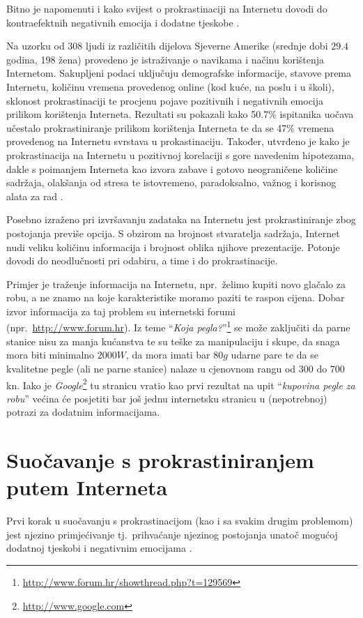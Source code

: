 \documentclass[11pt,english]{article}
\begin{document}
\begin{multicols}{2}
Bitno je napomenuti i kako svijest o prokrastinaciji na Internetu dovodi do
kontraefektnih negativnih emocija i dodatne tjeskobe \cite{Kraut98internet}.

Na uzorku od 308 ljudi iz različitih dijelova Sjeverne Amerike (srednje dobi
$29.4$ godina, 198 žena) provedeno je istraživanje o navikama i načinu korištenja
Internetom. Sakupljeni podaci uključuju demografske informacije, stavove prema
Internetu, količinu vremena provedenog online (kod kuće, na poslu i u školi),
sklonost prokrastinaciji te procjenu pojave pozitivnih i negativnih emocija
prilikom korištenja Interneta. Rezultati su pokazali kako 50.7\% ispitanika
uočava učestalo prokrastiniranje prilikom korištenja Interneta te da se 47\%
vremena provedenog na Internetu svrstava u prokastinaciju. Također, utvrđeno je
kako je prokrastinacija na Internetu u pozitivnoj korelaciji s gore navedenim
hipotezama, dakle s poimanjem Interneta kao izvora zabave i gotovo neograničene
količine sadržaja, olakšanja od stresa te istovremeno, paradoksalno, važnog i
korisnog alata za rad \cite{Lavoie01cyberslacking}.

Posebno izraženo pri izvršavanju zadataka na Internetu jest prokrastiniranje zbog 
postojanja previše opcija. S obzirom na brojnost stvaratelja sadržaja, Internet
nudi veliku količinu informacija i brojnost oblika njihove prezentacije.
Potonje dovodi do neodlučnosti pri odabiru, a time i do prokrastinacije.

Primjer je traženje informacija na Internetu, npr.~želimo kupiti novo glačalo
za robu, a ne znamo na koje karakteristike moramo paziti te raspon cijena. 
Dobar izvor informacija za taj problem su internetski forumi
(npr.~\url{http://www.forum.hr}). Iz teme ``\emph{Koja pegla?}''\footnote{\url{http://www.forum.hr/showthread.php?t=129569}}
se može zaključiti da parne stanice nisu za manja kućanstva te su teške za
manipulaciju i skupe, da snaga mora biti minimalno $2000 W$, da mora
imati bar $80 g$ udarne pare te da se kvalitetne pegle (ali ne parne stanice)
nalaze u cjenovnom rangu od 300 do 700 kn. Iako je
\emph{Google}\footnote{\url{http://www.google.com}} tu stranicu vratio kao prvi
rezultat na upit ``\emph{kupovina pegle za robu}'' većina će posjetiti bar još
jednu internetsku stranicu u (nepotrebnoj) potrazi za dodatnim informacijama.


\section{Suočavanje s prokrastiniranjem putem Interneta}
Prvi korak u suočavanju s prokrastinacijom (kao i sa svakim drugim problemom)
jest njezino primjećivanje tj.~prihvaćanje njezinog postojanja unatoč
mogućoj dodatnoj tjeskobi i negativnim emocijama \cite{Kraut98internet}.


\end{multicols}
\end{document}
